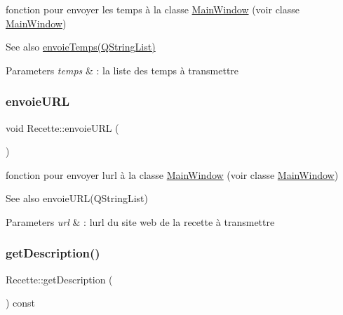fonction pour envoyer les temps à la classe \hyperlink{classMainWindow}{Main\+Window} (voir classe \hyperlink{classMainWindow}{Main\+Window}) 

\begin{DoxySeeAlso}{See also}
\hyperlink{classRecette_ad90a82b00fc7f1cc7d66ce54a3c853d8}{envoie\+Temps(\+Q\+String\+List)} 
\end{DoxySeeAlso}

\begin{DoxyParams}{Parameters}
{\em temps} & \+: la liste des temps à transmettre \\
\hline
\end{DoxyParams}
\mbox{\label{classRecette_a151a21f960ad1c36b8760dee77352d99}} 
\subsubsection{\texorpdfstring{envoie\+U\+RL}{envoieURL}}
{\footnotesize\ttfamily void Recette\+::envoie\+U\+RL (\begin{DoxyParamCaption}\item[{Q\+String}]{ }\end{DoxyParamCaption})\hspace{0.3cm}{\ttfamily [signal]}}



fonction pour envoyer l\textquotesingle{}url à la classe \hyperlink{classMainWindow}{Main\+Window} (voir classe \hyperlink{classMainWindow}{Main\+Window}) 

\begin{DoxySeeAlso}{See also}
envoie\+U\+R\+L(\+Q\+String\+List) 
\end{DoxySeeAlso}

\begin{DoxyParams}{Parameters}
{\em url} & \+: l\textquotesingle{}url du site web de la recette à transmettre \\
\hline
\end{DoxyParams}
\mbox{\label{classRecette_a7f3746b691f39d1b468b29819ad3c265}} 
\subsubsection{\texorpdfstring{get\+Description()}{getDescription()}}
{\footnotesize\ttfamily Recette\+::get\+Description (\begin{DoxyParamCaption}{ }\end{DoxyParamCaption}) const}



